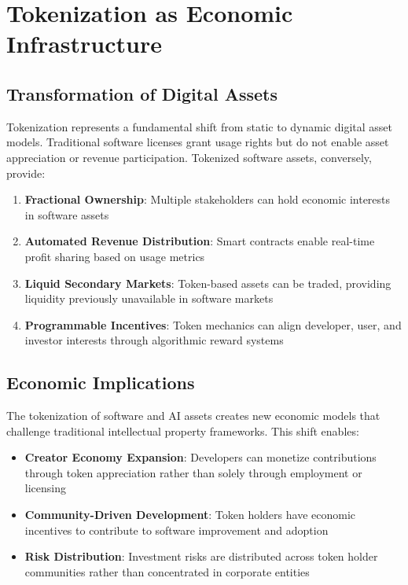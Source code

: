 \documentclass[11pt]{article}
\begin{document}
\section{Tokenization as Economic Infrastructure}

\subsection{Transformation of Digital Assets}

Tokenization represents a fundamental shift from static to dynamic digital asset models. Traditional software licenses grant usage rights but do not enable asset appreciation or revenue participation. Tokenized software assets, conversely, provide:

\begin{enumerate}
\item \textbf{Fractional Ownership}: Multiple stakeholders can hold economic interests in software assets
\item \textbf{Automated Revenue Distribution}: Smart contracts enable real-time profit sharing based on usage metrics
\item \textbf{Liquid Secondary Markets}: Token-based assets can be traded, providing liquidity previously unavailable in software markets
\item \textbf{Programmable Incentives}: Token mechanics can align developer, user, and investor interests through algorithmic reward systems
\end{enumerate}

\subsection{Economic Implications}

The tokenization of software and AI assets creates new economic models that challenge traditional intellectual property frameworks. This shift enables:

\begin{itemize}
\item \textbf{Creator Economy Expansion}: Developers can monetize contributions through token appreciation rather than solely through employment or licensing
\item \textbf{Community-Driven Development}: Token holders have economic incentives to contribute to software improvement and adoption
\item \textbf{Risk Distribution}: Investment risks are distributed across token holder communities rather than concentrated in corporate entities
\end{itemize}
\end{document}
